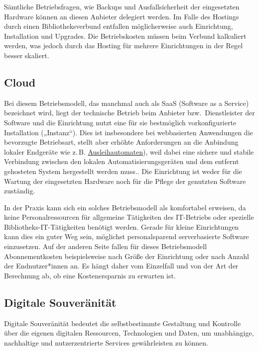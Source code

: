 \documentclass[
  11pt,
  letterpaper,
  DIV=11,
  twoside]{scrreprt}
\begin{document}
Sämtliche Betriebsfragen, wie Backups und Ausfallsicherheit der
eingesetzten Hardware können an diesen Anbieter delegiert werden. Im
Falle des Hostings durch einen Bibliotheksverbund entfallen
möglicherweise auch Einrichtung, Installation und Upgrades. Die
Betriebskosten müssen beim Verbund kalkuliert werden, was jedoch durch
das Hosting für mehrere Einrichtungen in der Regel besser skaliert.

\subsection{Cloud}\label{cloud}

Bei diesem Betriebsmodell, das manchmal auch als SaaS (Software as a
Service) bezeichnet wird, liegt der technische Betrieb beim Anbieter
bzw.~Dienstleister der Software und die Einrichtung nutzt eine für sie
bestmöglich vorkonfigurierte Installation („Instanz``). Dies ist
insbesondere bei webbasierten Anwendungen die bevorzugte Betriebsart,
stellt aber erhöhte Anforderungen an die Anbindung lokaler Endgeräte wie
z.\,B. \hyperref[selbstverbucher-ausleihautomaten]{Ausleihautomaten}),
weil dabei eine sichere und stabile Verbindung zwischen den lokalen
Automatisierungsgeräten und dem entfernt gehosteten System hergestellt
werden muss.. Die Einrichtung ist weder für die Wartung der eingesetzten
Hardware noch für die Pflege der genutzten Software zuständig.

In der Praxis kann sich ein solches Betriebsmodell als komfortabel
erweisen, da keine Personalressourcen für allgemeine Tätigkeiten des
IT-Betriebs oder spezielle Bibliotheks-IT-Tätigkeiten benötigt werden.
Gerade für kleine Einrichtungen kann dies ein guter Weg sein, möglichst
personalsparend serverbasierte Software einzusetzen. Auf der anderen
Seite fallen für dieses Betriebsmodell Abonnementkosten beispielsweise
nach Größe der Einrichtung oder nach Anzahl der Endnutzer*innen an. Es
hängt daher vom Einzelfall und von der Art der Berechnung ab, ob eine
Kostenersparnis zu erwarten ist.

\subsection{Digitale Souveränität}\label{digitale-souveruxe4nituxe4t}

Digitale Souveränität bedeutet die selbstbestimmte Gestaltung und
Kontrolle über die eigenen digitalen Ressourcen, Technologien und Daten,
um unabhängige, nachhaltige und nutzerzentrierte Services gewährleisten
zu können.
\end{document}

